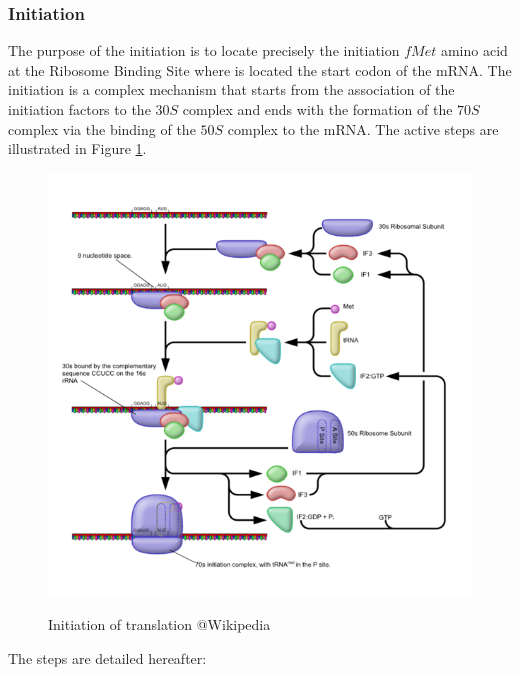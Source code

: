 \subsubsection{Initiation}
The purpose of the initiation is to locate precisely the initiation $fMet$ amino acid at the Ribosome Binding Site where is located the start codon of the mRNA. The initiation is a complex mechanism that starts from the association of the initiation factors to the $30S$ complex and ends with the formation of the $70S$ complex via the binding of the $50S$ complex to the mRNA. The active steps are illustrated in Figure \ref{fig:initTranslate}.
\begin{figure}[hbtp]
  \centering
  \includegraphics[width=15cm]{figure/prokaryoticTranslationInitiationFromWikibooks.png}\\
  \caption{Initiation of translation @Wikipedia}\label{fig:initTranslate}
\end{figure}
The steps are detailed hereafter:

